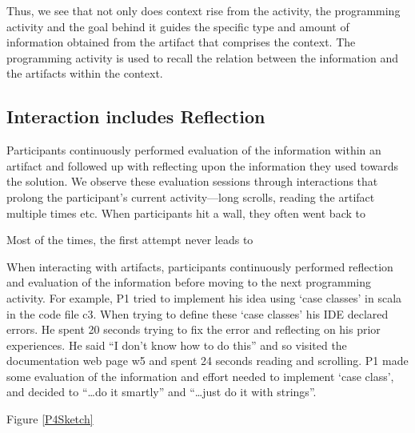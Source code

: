 Thus, we see that not only does context rise from the activity, the programming activity and the goal behind it guides the specific type and amount of information obtained from the artifact that comprises the context. The programming activity is used to recall the relation between the information and the artifacts within the context.



\subsection{Interaction includes Reflection}


Participants continuously performed evaluation of the information within an artifact and followed up with reflecting upon the information they used towards the solution. We observe these evaluation sessions through interactions that prolong the participant's current activity---long scrolls, reading the artifact multiple times etc. When participants hit a wall, they often went back to 



Most of the times, the first attempt never leads to 

When interacting with artifacts, participants continuously performed reflection and evaluation of the information before moving to the next programming activity. For example, P1 tried to implement his idea using `case classes' in scala in the code file c3. When trying to define these `case classes' his IDE declared errors. He spent 20 seconds trying to fix the error and reflecting on his prior experiences. He said ``I don't know how to do this'' and so visited the documentation web page w5 and spent 24 seconds reading and scrolling. P1 made some evaluation of the information and effort needed to implement `case class', and decided to ``\dots do it smartly'' and ``\dots just do it with strings''.

Figure \ref{P4Sketch}

